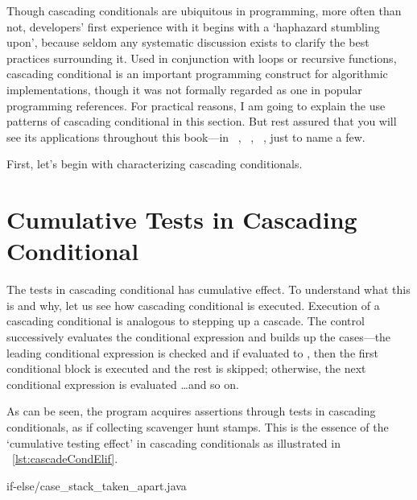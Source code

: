 Though cascading conditionals are ubiquitous in programming,
more often than not, developers' first experience with it begins with a `haphazard stumbling upon',
because seldom any systematic discussion exists to clarify the best practices surrounding it.
Used in conjunction with loops or recursive functions,
cascading conditional is an important programming construct for algorithmic implementations,
though it was not formally regarded as one in popular programming references.
For practical reasons, I am going to explain the use patterns of cascading conditional in this
section.
But rest assured that you will see its applications throughout this book---in
~, ~, ~, just to name a few.


First, let's begin with characterizing cascading conditionals.


\section{Cumulative Tests in Cascading Conditional}\label{sec:cumulativetests}

The tests in cascading conditional has cumulative effect.
To understand what this is and why, let us see how cascading conditional is executed.
Execution of a cascading conditional is analogous to stepping up a cascade.
The control successively evaluates the conditional expression and builds up the cases---the
leading conditional expression is checked and if evaluated to , then the
first conditional block is executed and the rest is skipped;
otherwise, the next conditional expression is evaluated \ldots and so on.


As can be seen, the program acquires  assertions through tests in cascading
conditionals, as if collecting scavenger hunt stamps.
This is the essence of the `cumulative testing effect' in cascading conditionals as
illustrated in ~\autoref{lst:cascadeCondElif}.


\begin{clisting}[tbh]
    \centering
    
    {if-else/case_stack_taken_apart.java}
\end{clisting}

